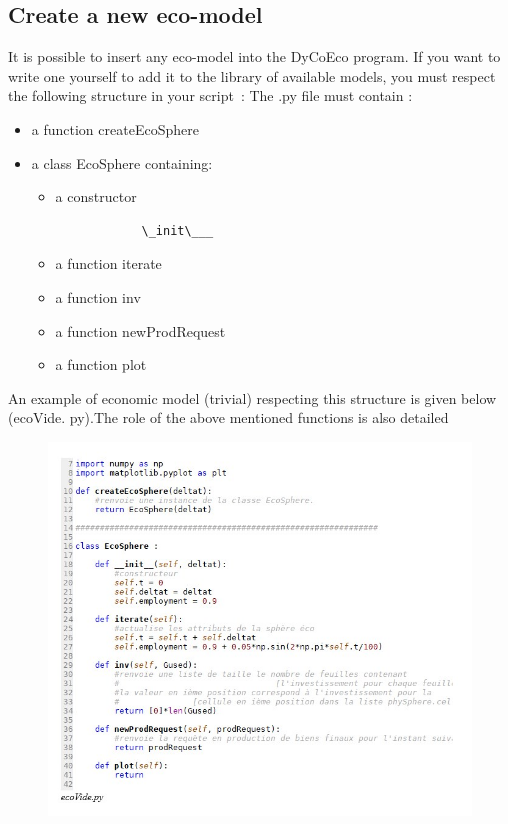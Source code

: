 \documentclass[12pt,a4paper]{article}%
\begin{document}
\begin{appendix}
\subsection{Create a new eco-model} 
It is possible to insert any eco-model into the DyCoEco program. If you want to write one yourself to add it to the library of available models, you must respect the following structure in your script~: The .py file must contain :  
\begin{itemize} 
	\item a function createEcoSphere 
\end{itemize} 
\begin{itemize} 
	\item a class EcoSphere containing:  
	\begin{itemize} 
		\item a constructor 
		\begin{verbatim}
			\_init\___ 
		\end{verbatim}
		\item a function iterate 
		\item a function inv 
		\item a function newProdRequest 
		\item a function plot 
	\end{itemize} 
\end{itemize} 
An example of economic model (trivial) respecting this structure is given below (ecoVide. py).\newline The role of the above mentioned functions is also detailed \begin{figure}[h] 
	\includegraphics[width=1.0\textwidth]{figures/EcoVide-py.jpg}
\end{figure}  


\end{appendix}
\end{document}
